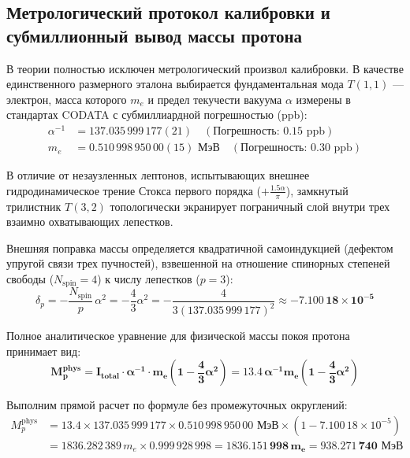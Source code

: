 \documentclass[12pt,a4paper]{article}
\begin{document}
	\subsection{Метрологический протокол калибровки и субмиллионный вывод массы протона}
	
	В теории полностью исключен метрологический произвол калибровки. В качестве единственного размерного эталона выбирается фундаментальная мода $T(1,1)$ — электрон, масса которого $m_e$ и предел текучести вакуума $\alpha$ измерены в стандартах CODATA с субмиллиардной погрешностью (ppb):
	\begin{align}
		\alpha^{-1} &= 137.035\,999\,177(21) \quad (\text{Погрешность: } 0.15 \text{ ppb}) \\
		m_e &= 0.510\,998\,950\,00(15) \text{ МэВ} \quad (\text{Погрешность: } 0.30 \text{ ppb})
	\end{align}
	
	В отличие от незаузленных лептонов, испытывающих внешнее гидродинамическое трение Стокса первого порядка ($+\frac{1.5\alpha}{\pi}$), замкнутый трилистник $T(3,2)$ топологически экранирует пограничный слой внутри трех взаимно охватывающих лепестков. 
	
	Внешняя поправка массы определяется квадратичной самоиндукцией (дефектом упругой связи трех пучностей), взвешенной на отношение спинорных степеней свободы ($N_{\text{spin}} = 4$) к числу лепестков ($p = 3$):
	\begin{equation}
		\delta_p = -\frac{N_{\text{spin}}}{p} \, \alpha^2 = -\frac{4}{3} \alpha^2 = -\frac{4}{3(137.035\,999\,177)^2} \approx \mathbf{-7.100\,18 \times 10^{-5}}
	\end{equation}
	
	Полное аналитическое уравнение для физической массы покоя протона принимает вид:
	\begin{equation}
		\mathbf{M_p^{\text{phys}} = I_{\text{total}} \cdot \alpha^{-1} \cdot m_e \left( 1 - \frac{4}{3}\alpha^2 \right) = 13.4 \, \alpha^{-1} m_e \left( 1 - \frac{4}{3}\alpha^2 \right)}
	\end{equation}
	
	Выполним прямой расчет по формуле без промежуточных округлений:
	\begin{align}
		M_p^{\text{phys}} &= 13.4 \times 137.035\,999\,177 \times 0.510\,998\,950\,00 \text{ МэВ} \times \left( 1 - 7.100\,18 \times 10^{-5} \right) \nonumber \\
		&= 1836.282\,389 \, m_e \times 0.999\,928\,998 = \mathbf{1836.151\,998 \, m_e} = \mathbf{938.271\,740 \text{ МэВ}}
	\end{align}
	
\end{document}
